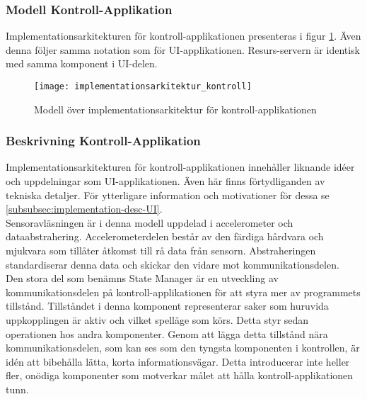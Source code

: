\subsubsection{Modell Kontroll-Applikation}
Implementationsarkitekturen för kontroll-applikationen presenteras i figur \ref{fig:implementationsarkitektur-kontroll}. Även denna följer samma notation som för UI-applikationen. Resurs-servern är identisk med samma komponent i UI-delen.

\begin{figure}[h]
    \centering
    \texttt{[image: implementationsarkitektur\_kontroll]}
    \caption{Modell över implementationsarkitektur för kontroll-applikationen}
    \label{fig:implementationsarkitektur-kontroll}
\end{figure}

\subsubsection{Beskrivning Kontroll-Applikation}
Implementationsarkitekturen för kontroll-applikationen innehåller liknande idéer och uppdelningar som UI-applikationen. Även här finns förtydliganden av tekniska detaljer. För ytterligare information och motivationer för dessa se \ref{subsubsec:implementation-desc-UI}.\\

Sensoravläsningen är i denna modell uppdelad i accelerometer och dataabstrahering. Accelerometerdelen består av den färdiga hårdvara och mjukvara som tillåter åtkomst till rå data från sensorn. Abstraheringen standardiserar denna data och skickar den vidare mot kommunikationsdelen.\\

Den stora del som benämns State Manager är en utveckling av kommunikationsdelen på kontroll-applikationen för att styra mer av programmets tillstånd. Tillståndet i denna komponent representerar saker som huruvida uppkopplingen är aktiv och vilket spelläge som körs. Detta styr sedan operationen hos andra komponenter. Genom att lägga detta tillstånd nära kommunikationsdelen, som kan ses som den tyngsta komponenten i kontrollen, är idén att bibehålla lätta, korta informationsvägar. Detta introducerar inte heller fler, onödiga komponenter som motverkar målet att hålla kontroll-applikationen tunn.\\
